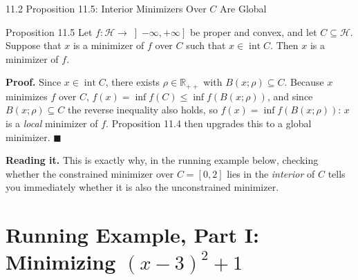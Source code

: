 \documentclass[aspectratio=169,10pt]{beamer}
\newcommand{\mHH}{\mathcal H}
\newcommand{\Rpp}{\mathbb{R}_{++}}
\newcommand{\intr}{\operatorname{int}}
\begin{document}
\begin{frame}{11.2 Proposition 11.5: Interior Minimizers Over $C$ Are Global}

  \begin{block}{Proposition 11.5}
    Let $f:\mHH\to\left]-\infty,+\infty\right]$ be proper and convex,
    and let $C\subseteq\mHH$. Suppose that $x$ is a minimizer of $f$
    over $C$ such that $x\in\intr C$. Then $x$ is a minimizer of $f$.
  \end{block}

  \textbf{Proof.} Since $x\in\intr C$, there exists $\rho\in\Rpp$
  with $B(x;\rho)\subseteq C$. Because $x$ minimizes $f$ over $C$,
  $f(x)=\inf f(C)\le\inf f(B(x;\rho))$, and since
  $B(x;\rho)\subseteq C$ the reverse inequality also holds, so
  $f(x)=\inf f(B(x;\rho))$: $x$ is a \emph{local} minimizer of $f$.
  Proposition 11.4 then upgrades this to a global minimizer.
  \hfill$\blacksquare$

  \vspace{0.3em}
  \textbf{Reading it.} This is exactly why, in the running example
  below, checking whether the constrained minimizer over $C=[0,2]$
  lies in the \emph{interior} of $C$ tells you immediately whether it
  is also the unconstrained minimizer.

\end{frame}

\section{Running Example, Part I: Minimizing $(x-3)^2+1$}
\end{document}

